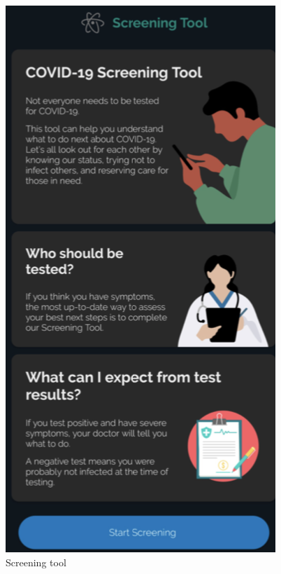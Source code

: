 \begin{center}
\includegraphics[scale=0.55]{tool.png}\\[0.75cm]
\caption{Screening tool}
\end{center}
